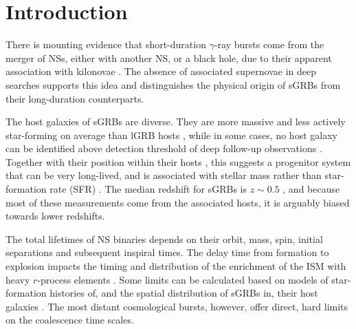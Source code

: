 \documentclass{aa}    %
\begin{document}
\maketitle

\section{Introduction}


There is mounting evidence that short-duration $\gamma$-ray bursts
come from the merger of NSs, either with another NS, or a black
hole, due to their apparent association with kilonovae \citep{Barnes2013a,
	Tanvir2013b, Yang2015, Jin2016, Rosswog2016}. The absence of associated
supernovae in deep searches \citep[e.g.][]{Hjorth2005a,Fox2005,Hjorth2005b}
supports this idea and distinguishes the physical origin of sGRBs from their
long-duration counterparts. %

The host galaxies of sGRBs are diverse. They are more massive and less actively
star-forming on average than lGRB hosts \citep{Fong2013b}, while in some cases,
no host galaxy can be identified above detection threshold of deep follow-up
observations \citep{Berger2010a, Tunnicliffe2014}. Together with their position
within their hosts \citep{Fong2013a}, this suggests a progenitor system that can
be very long-lived, and is associated with stellar mass rather than
star-formation rate (SFR) \citep{Berger2014}. The median redshift for sGRBs is
$z\sim0.5$ \citep{Berger2014}, and because most of these measurements come from
the associated hosts, it is arguably biased towards lower redshifts.


The total lifetimes of NS binaries depends on their orbit, mass, spin, initial
separations and subsequent inspiral times. The delay time from formation to
explosion impacts the timing and distribution of the enrichment of the ISM with
heavy $r$-process elements \citep{VandeVoort2015, Wallner2015,  Ji2016}. Some
limits can be calculated based on models of star-formation histories of, and the
spatial distribution of sGRBs in, their host galaxies \citep[][]{Berger2014}.
The most distant cosmological bursts, however, offer direct, hard limits on the
coalescence time scales.
\end{document}
